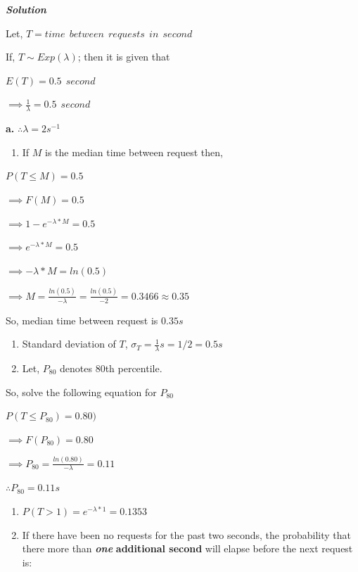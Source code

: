 \documentclass[
]{article}
\providecommand{\tightlist}{%
  \setlength{\itemsep}{0pt}\setlength{\parskip}{0pt}}
\begin{document}
\textbf{\emph{Solution}}

Let, \(T=time \ \ between \ \ requests \ \ in \ \ second\)

If, \(T\sim Exp(\lambda)\); then it is given that

\(E(T)=0.5 \ \ second\)

\(\implies \frac{1}{\lambda}=0.5 \ \ second\)

\textbf{a.} \(\therefore \lambda=2 s^{-1}\)

\begin{enumerate}
\def\labelenumi{\alph{enumi}.}
\setcounter{enumi}{1}
\tightlist
\item
  If \(M\) is the median time between request then,
\end{enumerate}

\(P(T \le M)=0.5\)

\(\implies F(M)=0.5\)

\(\implies 1-e^{-\lambda *M}=0.5\)

\(\implies e^{-\lambda *M}=0.5\)

\(\implies {-\lambda *M}=ln(0.5)\)

\(\implies M =\frac{ln(0.5)}{-\lambda}=\frac{ln(0.5)}{-2}=0.3466\approx0.35\)

So, median time between request is \(0.35s\)

\begin{enumerate}
\def\labelenumi{\alph{enumi}.}
\setcounter{enumi}{2}
\item
  Standard deviation of \(T\), \(\sigma_T=\frac{1}{\lambda}s=1/2 =0.5 s\)
\item
  Let, \(P_{80}\) denotes 80th percentile.
\end{enumerate}

So, solve the following equation for \(P_{80}\)

\(P(T\le P_{80})=0.80)\)

\(\implies F(P_{80})=0.80\)

\(\implies P_{80}=\frac {ln(0.80)}{-\lambda}=0.11\)

\(\therefore P_{80}=0.11 s\)

\begin{enumerate}
\def\labelenumi{\alph{enumi}.}
\setcounter{enumi}{4}
\item
  \(P(T>1)=e^{-\lambda *1}=0.1353\)
\item
  If there have been no requests for the past two seconds, the probability that there more than \textbf{\emph{one}} \textbf{additional second} will elapse before the next request is:
\end{enumerate}
\end{document}
